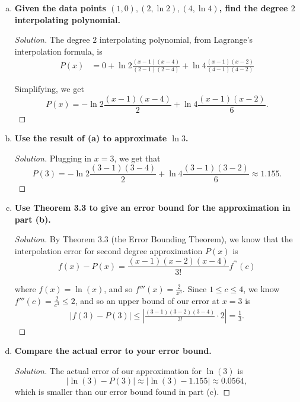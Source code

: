 \documentclass[11pt]{article}
\newenvironment{solution}
  {\renewcommand\qedsymbol{$\blacksquare$}\begin{proof}[Solution]}
  {\end{proof}}
\theoremstyle{definition}
\begin{document}
\begin{enumerate}[a)]
    \item \textbf{Given the data points $(1, 0), (2, \ln 2), (4, \ln 4)$, find the degree $2$ interpolating polynomial.}
    
    \begin{solution}
        The degree $2$ interpolating polynomial, from Lagrange's interpolation formula, is
    \begin{align*} P(x) &= 0 + \ln 2\frac{(x-1)(x-4)}{(2-1)(2-4)} + \ln 4 \frac{(x-1)(x-2)}{(4-1)(4-2)} \end{align*}
    
    Simplifying, we get \[\boxed{P(x) = -\ln 2\frac{(x-1)(x-4)}{2} + \ln 4 \frac{(x-1)(x-2)}{6}}. \]
    \end{solution}

    \item \textbf{Use the result of (a) to approximate $\ln 3$.} 
    \begin{solution}
        Plugging in $x = 3$, we get that \[P(3) =  -\ln 2\frac{(3-1)(3-4)}{2} + \ln 4 \frac{(3-1)(3-2)}{6} \approx \boxed{1.155}.\]
    \end{solution}

    \item \textbf{Use Theorem 3.3 to give an error bound for the approximation in part (b).}
    
    \begin{solution}
    By Theorem $3.3$ (the Error Bounding Theorem), we know that the interpolation error for second degree approximation $P(x)$ is 
    \[ f(x) - P(x) = \frac{(x-1)(x-2)(x-4)}{3!} f^{'''}(c)\]

    where $f(x) = \ln(x)$, and so $f'''(x) = \frac{2}{x^3}.$ Since $1 \leq c \leq 4$, we know $f'''(c) = \frac{2}{c^3} \leq 2$, and so an upper bound of our error at $x = 3$ is
    \begin{align*} |f(3) - P(3)| \leq \left|\frac{(3-1)(3-2)(3-4)}{3!} \cdot 2\right| = \boxed{\frac{1}{3}}. \end{align*}
    \end{solution}

    \item \textbf{Compare the actual error to your error bound.}
    
    \begin{solution}
    The actual error of our approximation for $\ln(3)$ is \[|\ln(3) - P(3)| \approx |\ln(3) - 1.155| \approx \boxed{0.0564},\] which is smaller than our error bound found in part (c).
    \end{solution}
\end{enumerate}
\end{document}
